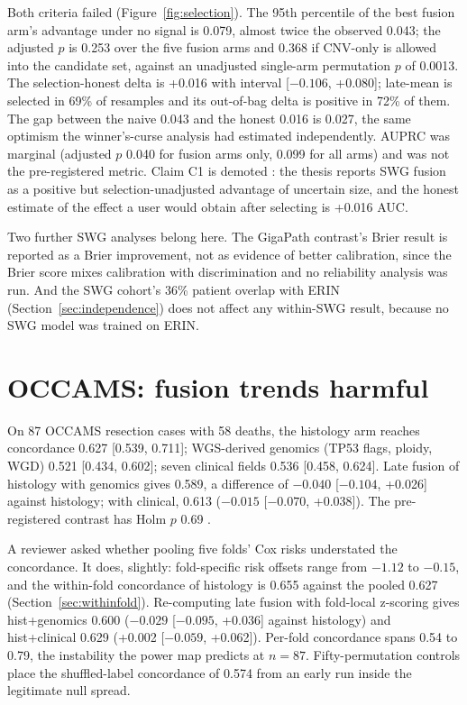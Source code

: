 Both criteria failed (Figure~\ref{fig:selection}). The 95th percentile of the best fusion arm's advantage under no signal is 0.079, almost twice the observed 0.043; the adjusted $p$ is 0.253 over the five fusion arms and 0.368 if CNV-only is allowed into the candidate set, against an unadjusted single-arm permutation $p$ of 0.0013. The selection-honest delta is +0.016 with interval [$-0.106$, +0.080]; late-mean is selected in 69\% of resamples and its out-of-bag delta is positive in 72\% of them. The gap between the naive 0.043 and the honest 0.016 is 0.027, the same optimism the winner's-curse analysis had estimated independently. AUPRC was marginal (adjusted $p$ 0.040 for fusion arms only, 0.099 for all arms) and was not the pre-registered metric. Claim C1 is demoted : the thesis reports SWG fusion as a positive but selection-unadjusted advantage of uncertain size, and the honest estimate of the effect a user would obtain after selecting is +0.016 AUC.

Two further SWG analyses belong here. The GigaPath contrast's Brier result is reported as a Brier improvement, not as evidence of better calibration, since the Brier score mixes calibration with discrimination and no reliability analysis was run. And the SWG cohort's 36\% patient overlap with ERIN (Section~\ref{sec:independence}) does not affect any within-SWG result, because no SWG model was trained on ERIN.

\section{OCCAMS: fusion trends harmful}
\label{sec:occams_result}

On 87 OCCAMS resection cases with 58 deaths, the histology arm reaches concordance 0.627 [0.539, 0.711]; WGS-derived genomics (TP53 flags, ploidy, WGD) 0.521 [0.434, 0.602]; seven clinical fields 0.536 [0.458, 0.624]. Late fusion of histology with genomics gives 0.589, a difference of $-0.040$ [$-0.104$, +0.026] against histology; with clinical, 0.613 ($-0.015$ [$-0.070$, +0.038]). The pre-registered contrast has Holm $p$ 0.69 .

A reviewer asked whether pooling five folds' Cox risks understated the concordance. It does, slightly: fold-specific risk offsets range from $-1.12$ to $-0.15$, and the within-fold concordance of histology is 0.655 against the pooled 0.627 (Section~\ref{sec:withinfold}). Re-computing late fusion with fold-local z-scoring gives hist+genomics 0.600 ($-0.029$ [$-0.095$, +0.036] against histology) and hist+clinical 0.629 (+0.002 [$-0.059$, +0.062]). Per-fold concordance spans 0.54 to 0.79, the instability the power map predicts at $n=87$. Fifty-permutation controls place the shuffled-label concordance of 0.574 from an early run inside the legitimate null spread.

